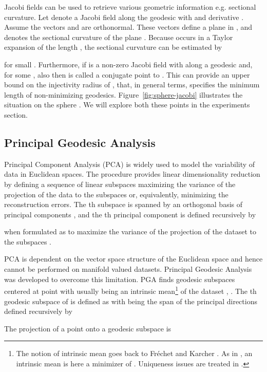 \documentclass[final]{svjour3}
\begin{document}
Jacobi fields can be used to retrieve various geometric information e.g.
sectional curvature. Let  denote a Jacobi field along the geodesic  with
 and derivative . Assume the vectors  and  
are orthonormal. These vectors define
a plane  in , and  denotes the sectional
curvature of the plane . Because  occurs in a Taylor expansion of the length ,
the sectional curvature can be estimated by

for small .
Furthermore, if  is a non-zero Jacobi field with  along a geodesic
 and, for some
, also  then  is called a
conjugate point to . This
can provide an upper bound on the injectivity radius of , that, in
general terms, specifies the minimum length of non-minimizing
geodesics. Figure~\ref{fig:sphere-jacobi} illustrates the situation on the
sphere . We will explore both these points in the experiments section.

\subsection{Principal Geodesic Analysis}
\label{sec:pga-def}
Principal Component Analysis (PCA) is widely used to model the
variability of data in Euclidean spaces. The procedure provides linear
dimensionality reduction by
defining a sequence of linear subspaces maximizing the variance of the projection
of the data to the subspaces or, equivalently, minimizing the reconstruction errors. The th 
subspace is spanned by an orthogonal
basis  of principal components , and
the th principal component is defined recursively by

when formulated as to maximize the variance of the projection of the dataset
 to the subspaces .

PCA is dependent on the vector space structure of the Euclidean space and hence cannot be performed 
on manifold valued datasets. Principal Geodesic
Analysis was developed to overcome this limitation. 
PGA finds geodesic subspaces centered at point  with  usually being
an intrinsic mean\footnote{
The notion of intrinsic mean goes back to Fr\'echet \cite{frechet_les_1948} 
and Karcher \cite{karcher_riemannian_1977}.
As in \cite{fletcher_principal_2004-1}, an intrinsic mean is here a minimizer of
. Uniqueness issues are treated in 
\cite{karcher_riemannian_1977}.
}
of the dataset , .
The th geodesic subspace  of  is defined as
 with  
being the span of the principal directions  defined recursively by

The projection
 of a point 
onto a geodesic subspace  is
\end{document}
